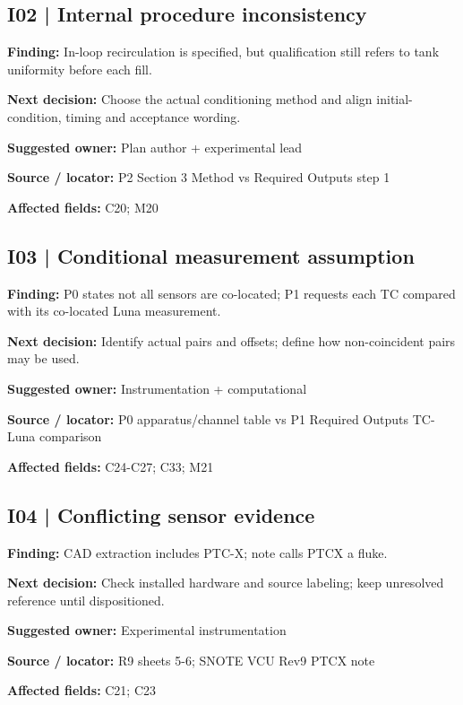 \documentclass[11pt]{article}
\begin{document}
\par\noindent\begin{minipage}{\textwidth}\small\setlength{\parskip}{2pt}
\subsection*{I02 | Internal procedure inconsistency}
\textbf{Finding:} In-loop recirculation is specified, but qualification still refers to tank uniformity before each fill.\par
\textbf{Next decision:} Choose the actual conditioning method and align initial-condition, timing and acceptance wording.\par
\textbf{Suggested owner:} Plan author + experimental lead\par
\textbf{Source / locator:} P2 Section 3 Method vs Required Outputs step 1\par
\textbf{Affected fields:} C20; M20\par
\end{minipage}\par\vspace{8pt}
\par\noindent\begin{minipage}{\textwidth}\small\setlength{\parskip}{2pt}
\subsection*{I03 | Conditional measurement assumption}
\textbf{Finding:} P0 states not all sensors are co-located; P1 requests each TC compared with its co-located Luna measurement.\par
\textbf{Next decision:} Identify actual pairs and offsets; define how non-coincident pairs may be used.\par
\textbf{Suggested owner:} Instrumentation + computational\par
\textbf{Source / locator:} P0 apparatus/channel table vs P1 Required Outputs TC-Luna comparison\par
\textbf{Affected fields:} C24-C27; C33; M21\par
\end{minipage}\par\vspace{8pt}
\par\noindent\begin{minipage}{\textwidth}\small\setlength{\parskip}{2pt}
\subsection*{I04 | Conflicting sensor evidence}
\textbf{Finding:} CAD extraction includes PTC-X; note calls PTCX a fluke.\par
\textbf{Next decision:} Check installed hardware and source labeling; keep unresolved reference until dispositioned.\par
\textbf{Suggested owner:} Experimental instrumentation\par
\textbf{Source / locator:} R9 sheets 5-6; SNOTE VCU Rev9 PTCX note\par
\textbf{Affected fields:} C21; C23\par
\end{minipage}\par\vspace{8pt}
\end{document}
